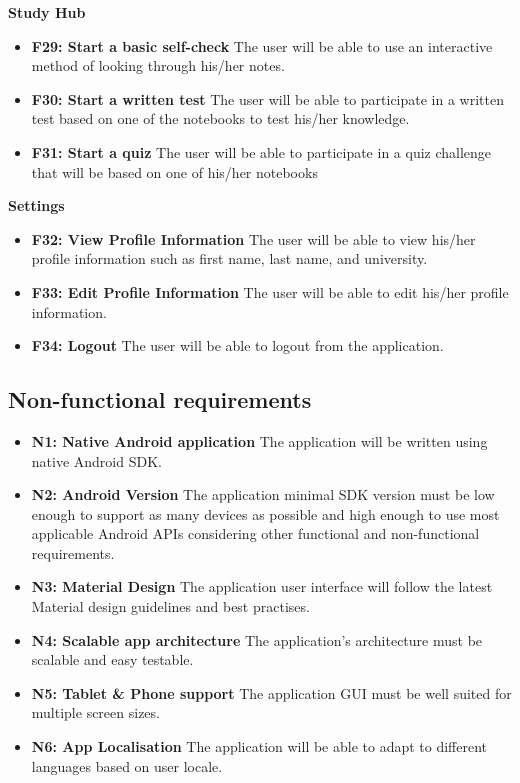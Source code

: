 \documentclass[thesis=B,english]{FITthesis}[2012/10/20]
\begin{document}
\bigskip
\textbf{Study Hub}
\begin{itemize}
	\item \textbf{F29: Start a basic self-check} The user will be able to use an interactive method of looking through his/her notes.
	\item \textbf{F30: Start a written test} The user will be able to participate in a written test based on one of the notebooks to test his/her knowledge.
	\item \textbf{F31: Start a quiz} The user will be able to participate in a quiz challenge that will be based on one of his/her notebooks
	
\end{itemize}


\bigskip
\textbf{Settings}
\begin{itemize}
	\item \textbf{F32: View Profile Information} The user will be able to view his/her profile information such as first name, last name, and  university.
	\item \textbf{F33: Edit Profile Information} The user will be able to edit his/her profile information.
	\item \textbf{F34: Logout} The user will be able to logout from the application.
\end{itemize}


\subsection{Non-functional requirements}

\begin{itemize}
  \item \textbf{N1: Native Android application}  The application will be written using native Android SDK.
  \item \textbf{N2: Android Version} The application minimal SDK version must be low enough to support as many devices as possible and high enough to use most applicable  Android APIs considering other functional and non-functional requirements.
  \item \textbf{N3: Material Design} The application user interface will follow the latest Material design guidelines and best practises.
  \item \textbf{N4: Scalable app architecture} The application's architecture must be scalable and easy testable.
  \item \textbf{N5: Tablet \& Phone support} The application GUI must be well suited for multiple screen sizes.
  \item \textbf{N6: App Localisation} The application will be able to adapt to different languages based on user locale.
\end{itemize}
\end{document}
